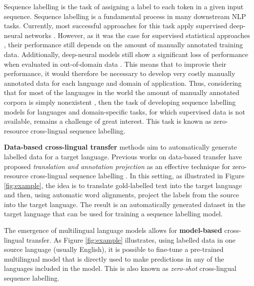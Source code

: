 \documentclass[11pt]{article}
\begin{document}
Sequence labelling is the task of assigning a label to each token in a given input sequence. Sequence labelling is a fundamental process in many downstream NLP tasks. Currently, most successful approaches for this task apply supervised deep-neural networks \cite{lample-etal-2016-neural,akbik-etal-2018-contextual,DBLP:conf/naacl/DevlinCLT19,xlmr}. However, as it was the case for supervised statistical approaches \cite{AGERRI201663}, their performance still depends on the amount of manually annotated training data. Additionally, deep-neural models still show a significant loss of performance when evaluated in out-of-domain data \cite{DBLP:conf/aaai/Liu0YDJCMF21}. This means that to improvie their performance, it would therefore be necessary to develop very costly manually annotated data for each language and domain of application. Thus, considering that for most of the languages in the world the amount of manually annotated corpora is simply nonexistent \cite{joshi-etal-2020-state}, then the task of developing sequence labelling models for languages and domain-specific tasks, for which supervised data is not available, remains a challenge of great interest. This task is known as zero-resource cross-lingual sequence labelling.





{\bf Data-based cross-lingual transfer} methods aim to automatically generate labelled data for a target language. 
Previous works on data-based transfer have proposed \emph{translation and annotation projection} as an effective technique for zero-resource cross-lingual sequence labelling \cite{jain-etal-2019-entity,fei-etal-2020-cross}. In this setting, as illustrated in Figure \ref{fig:example}, the idea is to translate gold-labelled text into the target language and then, using automatic word alignments, project the labels from the source into the target language. The result is an automatically generated dataset in the target language that can be used for training a sequence labelling model.

The emergence of multilingual language models \cite{DBLP:conf/naacl/DevlinCLT19,xlmr} allows for {\bf model-based} cross-lingual transfer. As Figure \ref{fig:example} illustrates, using labelled data in one source language (usually English),  it is possible to fine-tune a pre-trained multilingual model that is directly used to make predictions in any of the languages included in the model. This is also known as \emph{zero-shot} cross-lingual sequence labelling. 
\end{document}
